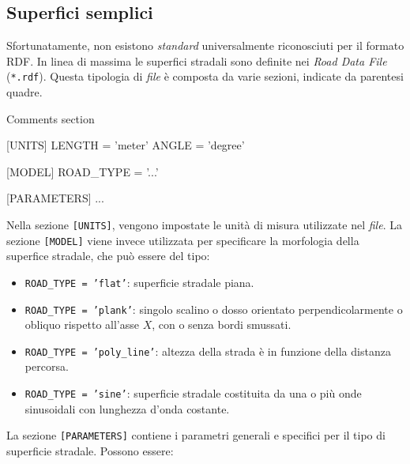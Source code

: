 \subsection{Superfici semplici}
Sfortunatamente, non esistono \textit{standard} universalmente riconosciuti per il formato RDF. In linea di massima le superfici stradali sono definite nei \textit{Road Data File} (\texttt{*.rdf}). Questa tipologia di \textit{file} è composta da varie sezioni, indicate da parentesi quadre.
\begin{pseudoc}
	{ Comments section }
	
	[UNITS]
	LENGTH = 'meter'
	ANGLE = 'degree'
	
	[MODEL]
	ROAD\_TYPE = '...'
	
	[PARAMETERS]
	...
\end{pseudoc}
Nella sezione \texttt{[UNITS]}, vengono impostate le unità di misura utilizzate nel \textit{file}. La sezione \texttt{[MODEL]} viene invece utilizzata per specificare la morfologia della superfice stradale, che può essere del tipo:
\begin{itemize}
	\item \texttt{ROAD\_TYPE = 'flat'}: superficie stradale piana.
	\item \texttt{ROAD\_TYPE = 'plank'}: singolo scalino o dosso orientato perpendicolarmente o obliquo rispetto all'asse $X$, con o senza bordi smussati.
	\item \texttt{ROAD\_TYPE = 'poly\_line'}: altezza della strada è in funzione della distanza percorsa.
	\item \texttt{ROAD\_TYPE = 'sine'}: superficie stradale costituita da una o più onde sinusoidali con lunghezza d'onda costante.
\end{itemize}
La sezione \texttt{[PARAMETERS]} contiene i parametri generali e specifici per il tipo di superficie stradale. Possono essere:
